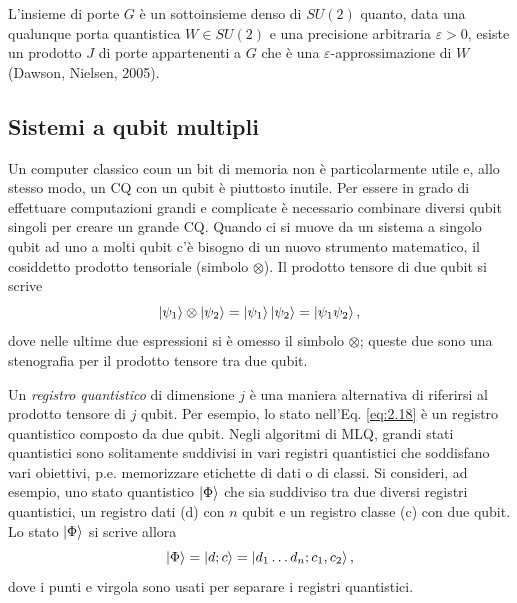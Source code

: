 L'insieme di porte $G$ è un sottoinsieme denso di $SU(2)$ quanto, data una qualunque porta 
quantistica $W\in SU(2)$ e una precisione arbitraria $\varepsilon > 0$, esiste un prodotto 
$J$ di porte appartenenti a $G$ che è una $\varepsilon$-approssimazione di $W$ 
(Dawson, Nielsen, 2005). 

\subsection{Sistemi a qubit multipli}

Un computer classico coun un bit di memoria non è particolarmente utile e, allo stesso modo, 
un \ac{CQ} con un qubit è piuttosto inutile. Per essere in grado di effettuare computazioni 
grandi e complicate è necessario combinare diversi qubit singoli per creare un grande \ac{CQ}. 
Quando ci si muove da un sistema a singolo qubit ad uno a molti qubit c'è bisogno di un 
nuovo strumento matematico, il cosiddetto prodotto tensoriale (simbolo $\otimes$). 
Il prodotto tensore di due qubit si scrive 
\begin{equation} \label{eq:2.18}
    \ket{\psi_1}\otimes\ket{\psi_2} = \ket{\psi_1}\ket{\psi_2} = \ket{\psi_1\psi_2},
\end{equation}
dove nelle ultime due espressioni si è omesso il simbolo $\otimes$; queste due sono 
una stenografia per il prodotto tensore tra due qubit. 

Un \emph{registro quantistico} di dimensione $j$ è una maniera alternativa di riferirsi 
al prodotto tensore di $j$ qubit. Per esempio, lo stato nell'Eq. \ref{eq:2.18} è un 
registro quantistico composto da due qubit. Negli algoritmi di \ac{MLQ}, grandi stati 
quantistici sono solitamente suddivisi in vari registri quantistici che soddisfano vari 
obiettivi, p.e. memorizzare etichette di dati o di classi. Si consideri, ad esempio, uno 
stato quantistico $\ket{\Phi}$ che sia suddiviso tra due diversi registri quantistici, 
un registro dati (d) con $n$ qubit e un registro classe (c) con due qubit. Lo stato $\ket{\Phi}$ 
si scrive allora 
\begin{equation} \label{eq:2.19}
    \ket{\Phi} = \ket{d;c} = \ket{d_1 \ldots d_n; c_1, c_2},
\end{equation}
dove i punti e virgola sono usati per separare i registri quantistici. 

